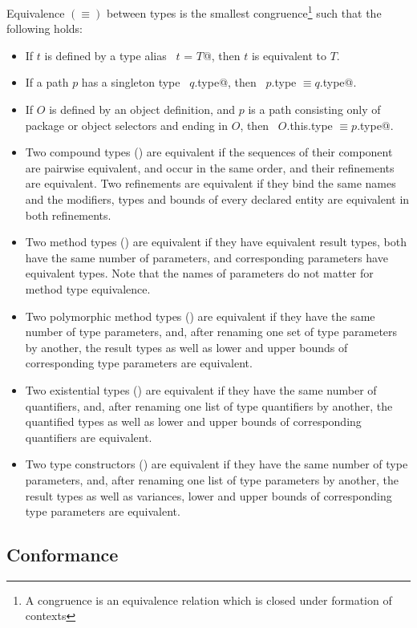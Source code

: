 Equivalence $(\equiv)$ between types is the smallest congruence\footnote{ A
congruence is an equivalence relation which is closed under formation
of contexts} such that the following holds:
\begin{itemize}
\item 
If $t$ is defined by a type alias ~\lstinline@type $t$ = $T$@, then $t$ is
equivalent to $T$.
\item
If a path $p$ has a singleton type ~\lstinline@$q$.type@, then
~\lstinline@$p$.type $\equiv q$.type@.
\item
If $O$ is defined by an object definition, and $p$ is a path
consisting only of package or object selectors and ending in $O$, then
~\lstinline@$O$.this.type $\equiv p$.type@.
\item
Two compound types () are equivalent if the sequences of their component
are pairwise equivalent, and occur in the same order, and their
refinements are equivalent. Two refinements are equivalent if they
bind the same names and the modifiers, types and bounds of every
declared entity are equivalent in both refinements.
\item
Two method types () are equivalent if they have equivalent result types,
both have the same number of parameters, and corresponding parameters
have equivalent types.  Note that the names of parameters do not
matter for method type equivalence.
\item 
Two polymorphic method types () are equivalent if they have the same number of
type parameters, and, after renaming one set of type parameters by
another, the result types as well as lower and upper bounds of
corresponding type parameters are equivalent.
\item 
Two existential types () 
are equivalent if they have the same number of
quantifiers, and, after renaming one list of type quantifiers by
another, the quantified types as well as lower and upper bounds of
corresponding quantifiers are equivalent.
\item %
Two type constructors () are equivalent if they have the 
same number of type parameters, and, after renaming one list of type parameters by
another, the result types as well as variances, lower and upper bounds of
corresponding type parameters are equivalent.
\end{itemize}

\subsection{Conformance}
\label{sec:conformance}

